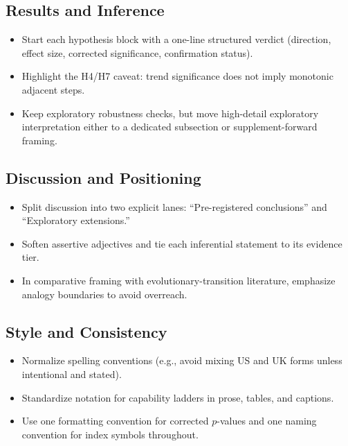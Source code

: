 \documentclass[11pt]{article}
\begin{document}
\subsection*{Results and Inference}
\begin{itemize}[leftmargin=1.5em]
  \item Start each hypothesis block with a one-line structured verdict (direction, effect size, corrected significance, confirmation status).
  \item Highlight the H4/H7 caveat: trend significance does not imply monotonic adjacent steps.
  \item Keep exploratory robustness checks, but move high-detail exploratory interpretation either to a dedicated subsection or supplement-forward framing.
\end{itemize}

\subsection*{Discussion and Positioning}
\begin{itemize}[leftmargin=1.5em]
  \item Split discussion into two explicit lanes: ``Pre-registered conclusions'' and ``Exploratory extensions.''
  \item Soften assertive adjectives and tie each inferential statement to its evidence tier.
  \item In comparative framing with evolutionary-transition literature, emphasize analogy boundaries to avoid overreach.
\end{itemize}

\subsection*{Style and Consistency}
\begin{itemize}[leftmargin=1.5em]
  \item Normalize spelling conventions (e.g., avoid mixing US and UK forms unless intentional and stated).
  \item Standardize notation for capability ladders in prose, tables, and captions.
  \item Use one formatting convention for corrected $p$-values and one naming convention for index symbols throughout.
\end{itemize}
\end{document}
